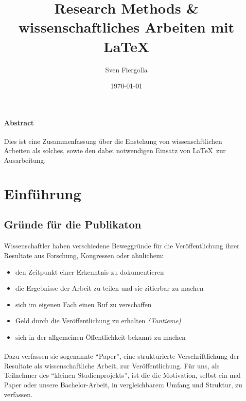 \documentclass[10pt, a4paper]{article}
\author{Sven Fiergolla}
\title{Research Methods \& wissenschaftliches Arbeiten mit \LaTeX}
\date{\today}
\begin{document}
\maketitle

\paragraph{Abstract}
Dies ist eine Zusammenfassung über die Enstehung von wissenschftlichen Arbeiten als solches, sowie den dabei notwendigen Einsatz von \LaTeX\  zur Ausarbeitung.
\par
\tableofcontents
\bigskip

\section{Einführung}
\subsection{Gründe für die Publikaton}
\paragraph{}
Wissenschaftler haben verschiedene Beweggründe für die Veröffentlichung ihrer Resultate aus Forschung, Kongressen oder ähnlichem:
\par
\begin{itemize}
\item den Zeitpunkt einer Erkenntnis zu dokumentieren
\item die Ergebnisse der Arbeit zu teilen und sie zitierbar zu machen
\item sich im eigenen Fach einen Ruf zu verschaffen
\item Geld durch die Veröffentlichung zu erhalten \textit{(Tantieme)}
\item sich in der allgemeinen Öffentlichkeit bekannt zu machen
\end{itemize}
\par
\paragraph{}
Dazu verfassen sie sogenannte \enquote{Paper}, eine strukturierte Verschriftlichung der Resultate als wissenschaftliche Arbeit, zur Veröffentlichung.
Für uns, als Teilnehmer des \enquote{kleinen Studienprojekts}, ist die die Motivation, selbst ein mal Paper oder unsere Bachelor-Arbeit, in vergleichbarem Umfang und Struktur, zu verfassen.
\par
\end{document}
